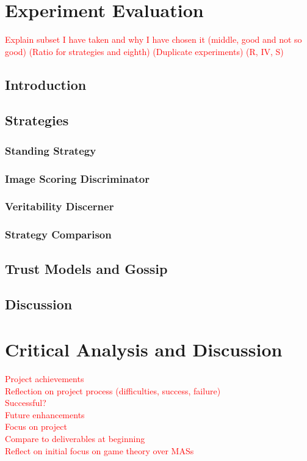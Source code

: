 \documentclass[]{final_report}
\begin{document}
\chapter{Experiment Evaluation}
\textcolor{red}{Explain subset I have taken and why I have chosen it (middle, good and not so good) (Ratio for strategies and eighth) (Duplicate experiments) (R, IV, S)}
\section{Introduction}

\section{Strategies}
\subsection{Standing Strategy}

\subsection{Image Scoring Discriminator}

\subsection{Veritability Discerner}

\subsection{Strategy Comparison}

\section{Trust Models and Gossip}

\section{Discussion}

\chapter{Critical Analysis and Discussion}
\textcolor{red}{Project achievements\\
Reflection on project process (difficulties, success, failure)\\
Successful?\\
Future enhancements\\
Focus on project\\
Compare to deliverables at beginning\\
Reflect on initial focus on game theory over MASs}
\end{document}

